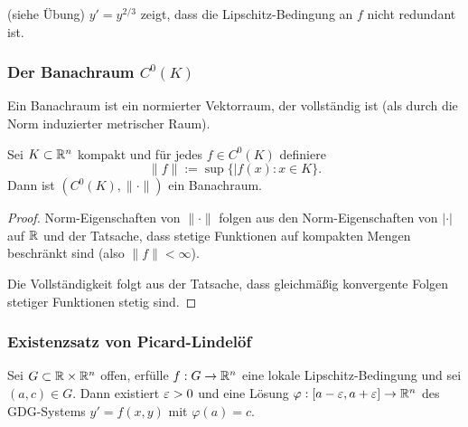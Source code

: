 \begin{exmp}
  (siehe Übung) $y' = y^{2/3}$ zeigt, dass die Lipschitz-Bedingung an $f$ nicht
  redundant ist.
\end{exmp}

\subsubsection{Der Banachraum \texorpdfstring{$C^0(K)$}{C0(K)}}
Ein Banachraum ist ein normierter Vektorraum, der vollständig ist (als durch die
Norm induzierter metrischer Raum).

\begin{thm}
  Sei $K \subset \mathbb{R}^n$ kompakt und für jedes $f \in C^0(K)$ definiere
  \[ \| f \| := \sup \{ | f(x) : x \in K \}. \]
  Dann ist $(C^0(K), \|\cdot\|)$ ein Banachraum.
\end{thm}

\begin{proof}
  Norm-Eigenschaften von $\|\cdot\|$ folgen aus den Norm-Eigenschaften von
  $|\cdot|$ auf $\mathbb{R}$ und der Tatsache, dass stetige Funktionen auf kompakten
  Mengen beschränkt sind (also $\|f\| < \infty$).

  Die Vollständigkeit folgt aus der Tatsache, dass gleichmäßig konvergente
  Folgen stetiger Funktionen stetig sind.
\end{proof}

\subsubsection{Existenzsatz von Picard-Lindelöf}
\begin{thm}
  Sei $G \subset \mathbb{R} \times \mathbb{R}^n$ offen, erfülle $f:G \to \mathbb{R}^n$ eine
  lokale Lipschitz-Bedingung und sei $(a,c) \in G$. Dann existiert $\varepsilon > 0$
  und eine Lösung $\varphi:[a-\varepsilon,a+\varepsilon] \to \mathbb{R}^n$ des GDG-Systems $y' =
  f(x,y)$ mit $\varphi(a) = c$.
\end{thm}

